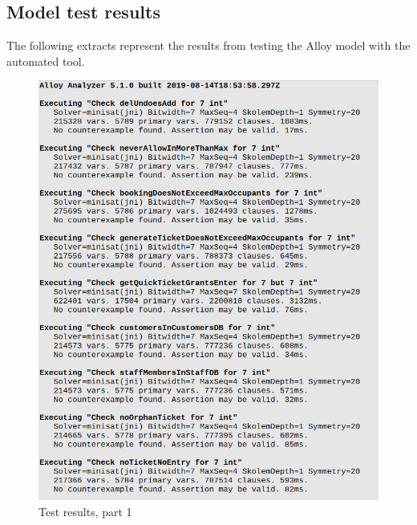 \subsection{Model test results}
The following extracts represent the results from testing the Alloy model with the automated tool.
\begin{figure} [H]
	\includegraphics[width=\linewidth]{../Alloy/alloy_result1.png}
	\caption{Test results, part 1}
	\label{fig:results1}
\end{figure}
